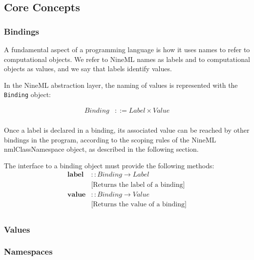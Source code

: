 \documentclass[a4paper]{article}
\newcommand\nmlClass[1]{{\tt #1}}
\begin{document}
\subsection{Core Concepts}

\subsubsection{Bindings}

A fundamental aspect of a programming language is how it uses names to
refer to computational objects.  We refer to NineML names as labels
and to computational objects as values, and we say that labels
identify values.

In the NineML abstraction layer, the naming of values is represented
with the \nmlClass{Binding} object:

\begin{equation*}
\begin{array}{ll}
   Binding & ::= Label \times Value \\
\end{array}
\end{equation*}

Once a label is declared in a binding, its associated value can be
reached by other bindings in the program, according to the scoping
rules of the NineML nmlClass{Namespace} object, as described in the
following section.

The interface to a binding object must provide the following methods:
\begin{equation*}
\begin{array}{ll}
   \mathbf{label} & :: Binding \rightarrow Label \\ & \textrm{[Returns the label of a binding]} \\
   \mathbf{value} & :: Binding \rightarrow Value \\ & \textrm{[Returns the value of a binding]} \\
\end{array}
\end{equation*}




\subsubsection{Values}



\subsubsection{Namespaces}
\end{document}
